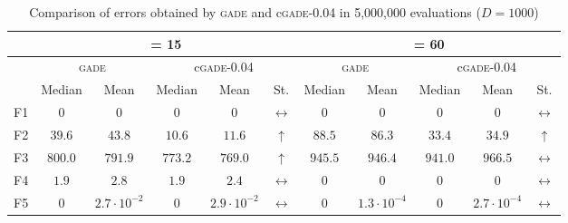 \begin{table*}[!t]
\caption{Comparison of errors obtained by \textsc{gade} and c\textsc{gade}-0.04 in 5,000,000 evaluations ($D = 1000$)}
\label{tab:gade}
\centering
\begin{scriptsize}
\begin{tabular}{c || c c | c c c || c c | c c c}
\hline
 & \multicolumn{5}{|c||}{\NP{} = 15} & \multicolumn{5}{|c}{\NP{} = 60} \\ \hline
 & \multicolumn{2}{|c|}{\textsc{gade}}      & \multicolumn{3}{|c||}{c\textsc{gade-0.04}}         & \multicolumn{2}{|c|}{\textsc{gade}} & \multicolumn{3}{|c}{c\textsc{gade-0.04}} \\ \hline
    & Median               & Mean                  & Median                        & Mean                          & St.               & Median               & Mean                          & Median                        & Mean                          & St.                \\ \hline
F1  & $0$                  & $0$                   & $0$                           & $0$                           & $\leftrightarrow$ & $0$                  & $0$                           & $0$                           & $0$                           & $\leftrightarrow$  \\ \hline
F2  & $39.6$               & $43.8$                & $\mathbf{10.6}$               & $\mathbf{11.6}$               & $\uparrow$        & $88.5$               & $86.3$                        & $\mathbf{33.4}$               & $\mathbf{34.9}$               & $\uparrow$         \\ \hline
F3  & $800.0$              & $791.9$               & $\mathbf{773.2}$              & $\mathbf{769.0}$              & $\uparrow$        & $945.5$              & $946.4$                       & $941.0$              & $966.5$              & $\leftrightarrow$  \\ \hline
F4  & $1.9$                & $2.8$                 & $1.9$                         & $2.4$                         & $\leftrightarrow$ & $0$                  & $0$                           & $0$                           & $0$                           & $\leftrightarrow$  \\ \hline
F5  & $0$                  & $2.7 \cdot 10^{-2}$   & $0$                           & $2.9 \cdot 10^{-2}$           & $\leftrightarrow$ & $0$                  & $1.3 \cdot 10^{-4}$           & $0$                           & $2.7 \cdot 10^{-4}$           & $\leftrightarrow$  \\ \hline

\end{tabular}
\end{scriptsize}
\end{table*}
